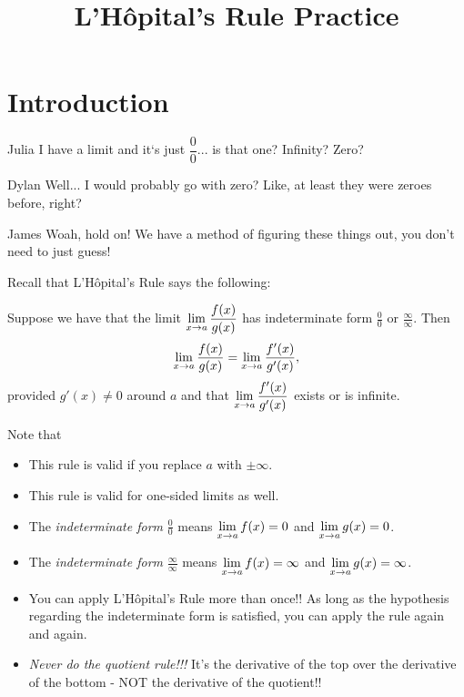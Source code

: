 \documentclass{ximera}
\title{L'H\^{o}pital's Rule Practice}
\newcommand{\LHop}{L'H\^{o}pital}
\begin{document}
\maketitle

\section{Introduction}
\begin{dialogue}
    \item[Julia] I have a limit and it`s just $\dfrac{0}{0}$... is that one? Infinity? Zero?
    \item[Dylan] Well... I would probably go with zero? Like, at least they were zeroes before, right?
    \item[James] Woah, hold on! We have a method of figuring these things out, you don't need to just guess!
\end{dialogue}

Recall that \LHop's Rule says the following:

\begin{theorem}
    Suppose we have that the limit $\displaystyle \lim_{x \to a} \displaystyle\frac{f(x)}{g(x)}$ has indeterminate form $\frac{0}{0}$ or $\frac{\infty}{\infty}$. Then
    \[
        \displaystyle \lim_{x \to a} \displaystyle\frac{f(x)}{g(x)} = \displaystyle \lim_{x \to a} \displaystyle\frac{f'(x)}{g'(x)},
    \]
provided $g'(x) \neq 0$ around $a$ and that $\displaystyle \lim_{x \to a} \displaystyle\frac{f'(x)}{g'(x)}$ exists or is infinite.
\end{theorem}


Note that
    \begin{itemize}
        \item This rule is valid if you replace $a$ with $\pm \infty$.
        \item This rule is valid for one-sided limits as well.
        \item The \emph{indeterminate form} $\frac{0}{0}$ means $\displaystyle \lim_{x \to a} f(x) = 0$ and $\displaystyle \lim_{x \to a} g(x) = 0$.
        \item The \emph{indeterminate form} $\frac{\infty}{\infty}$ means $\displaystyle \lim_{x \to a} f(x) = \infty$ and $\displaystyle \lim_{x \to a} g(x) = \infty$.
        \item You can apply L'H\^{o}pital's Rule more than once!! As long as the hypothesis regarding the indeterminate form is satisfied, you can apply the rule again and again.
        \item \emph{Never do the quotient rule!!!} It's the derivative of the top over the derivative of the bottom - NOT the derivative of the quotient!!
    \end{itemize} 
\end{document}
